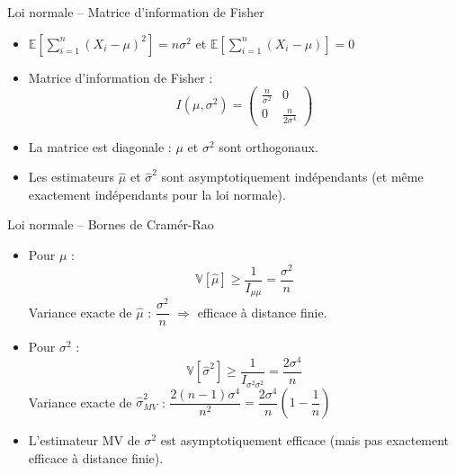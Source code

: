 \documentclass[11pt,aspectratio=169]{beamer}
\begin{document}
\begin{frame}{Loi normale -- Matrice d'information de Fisher}

\begin{itemize}

\item $\mathbb{E}\left[\sum_{i=1}^n(X_i - \mu)^2\right] = n\sigma^2$ et $\mathbb{E}\left[\sum_{i=1}^n(X_i - \mu)\right] = 0$\newline

\item Matrice d'information de Fisher :
  \[
  \boxed{I(\mu, \sigma^2) = \begin{pmatrix} \frac{n}{\sigma^2} & 0 \\ 0 & \frac{n}{2\sigma^4} \end{pmatrix}}
  \]

\item La matrice est diagonale : $\mu$ et $\sigma^2$ sont orthogonaux.\newline

\item Les estimateurs $\hat{\mu}$ et $\hat{\sigma}^2$ sont asymptotiquement indépendants (et même exactement indépendants pour la loi normale).

\end{itemize}

\end{frame}

\begin{frame}{Loi normale -- Bornes de Cramér-Rao}

\begin{itemize}

\item Pour $\mu$ :
  \[
  \mathbb{V}[\hat{\mu}] \geq \frac{1}{I_{\mu\mu}} = \frac{\sigma^2}{n}
  \]
  Variance exacte de $\hat{\mu}$ : $\dfrac{\sigma^2}{n}$ $\Rightarrow$ efficace à distance finie.\newline

\item Pour $\sigma^2$ :
  \[
  \mathbb{V}[\hat{\sigma}^2] \geq \frac{1}{I_{\sigma^2\sigma^2}} = \frac{2\sigma^4}{n}
  \]
  Variance exacte de $\hat{\sigma}^2_{MV}$ : $\dfrac{2(n-1)\sigma^4}{n^2} = \dfrac{2\sigma^4}{n}\left(1 - \dfrac{1}{n}\right)$\newline

\item L'estimateur MV de $\sigma^2$ est asymptotiquement efficace (mais pas exactement efficace à distance finie).

\end{itemize}

\end{frame}
\end{document}

